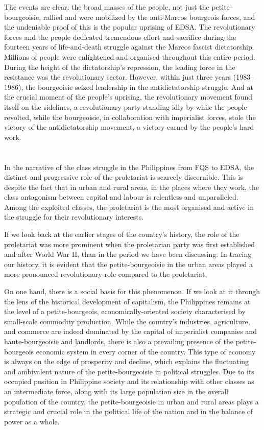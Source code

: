 The events are clear: 
the broad masses of the people, 
not just the petite-bourgeoisie, 
rallied and were mobilized 
by the anti-Marcos bourgeois forces, 
and the undeniable proof of this 
is the popular uprising of EDSA. 
The revolutionary forces and the people 
dedicated tremendous effort and sacrifice 
during the fourteen years of life-and-death struggle 
against the Marcos fascist dictatorship. 
Millions of people were enlightened and organised 
throughout this entire period. 
During the height of the dictatorship's repression, 
the leading force in the resistance 
was the revolutionary sector. 
However, 
within just three years (1983--1986), 
the bourgeoisie seized leadership in the antidictatorship struggle. 
And at the crucial moment of the people's uprising, 
the revolutionary movement found itself on the sidelines, 
a revolutionary party standing idly by 
while the people revolted, 
while the bourgeoisie, 
in collaboration with imperialist forces, 
stole the victory of the antidictatorship movement, 
a victory earned by the people's hard work.


\section{}
In the narrative of the class struggle in the Philippines 
from FQS to EDSA, 
the distinct and progressive role of the proletariat 
is scarcely discernible. 
This is despite the fact that in urban and rural areas, 
in the places where they work, 
the class antagonism between capital and labour is relentless and unparalleled. 
Among the exploited classes,
the proletariat is the most organised and active 
in the struggle for their revolutionary interests.

If we look back at the earlier stages of the country's history,
the role of the proletariat was more prominent 
when the proletarian party was first established 
and after World War II,
than in the period we have been discussing. 
In tracing our history, 
it is evident that the petite-bourgeoisie in the urban areas 
played a more pronounced revolutionary role compared to the proletariat.

On one hand, 
there is a social basis for this phenomenon. 
If we look at it through the lens of the historical development of capitalism, 
the Philippines remains at the level 
of a petite-bourgeois, economically-oriented society 
characterised by small-scale commodity production. 
While the country's industries, agriculture, and commerce 
are indeed dominated by 
the capital of imperialist companies 
and haute-bourgeoisie 
and landlords, 
there is also a prevailing presence of the petite-bourgeois economic system 
in every corner of the country. 
This type of economy is always on the edge of prosperity and decline, 
which explains the fluctuating and ambivalent nature 
of the petite-bourgeoisie in political struggles.
Due to its occupied position in Philippine society 
and its relationship with other classes as an intermediate force, 
along with its large population size in the overall population of the country, 
the petite-bourgeoisie in urban and rural areas 
plays a strategic and crucial role 
in the political life of the nation 
and in the balance of power as a whole.

